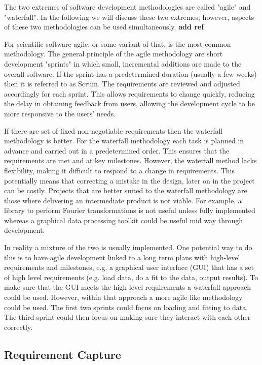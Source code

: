 \documentclass[jnr]{iosart2x}
\newcommand{\todo}[1]{\textbf{#1}}
\begin{document}
The two extremes of software development methodologies are called "agile" and "waterfall".
In the following we will discuss these two extremes; however, aspects of these two methodologies can be used simultaneously. \todo{add ref}

For scientific software agile, or some variant of that, is the most common methodology.
The general principle of the agile methodology are short development "sprints" in which small, incremental additions are made to the overall software.
If the sprint has a predetermined duration (usually a few weeks) then it is referred to as Scrum.
The requirements are reviewed and adjusted accordingly for each sprint.
This allows requirements to change quickly, reducing the delay in obtaining feedback from users, allowing the development cycle to be more responsive to the users' needs.

If there are set of fixed non-negotiable requirements then the waterfall methodology is better.
For the waterfall methodology each task is planned in advance and carried out in a predetermined order.
This ensures that the requirements are met and at key milestones.
However, the waterfall method lacks flexibility, making it difficult to respond to a change in requirements.
This potentially means that correcting a mistake in the design, later on in the project can be costly.
Projects that are better suited to the waterfall methodology are those where delivering an intermediate product is not viable.
For example, a library to perform Fourier transformations is not useful unless fully implemented whereas a graphical data processing toolkit could be useful mid way through development.

In reality a mixture of the two is usually implemented.
One potential way to do this is to have agile development linked to a long term plans with high-level requirements and milestones, e.g. a graphical user interface (GUI) that has a set of high level requirements (e.g. load data, do a fit to the data, output results).
To make sure that the GUI meets the high level requirements a waterfall approach could be used.
However, within that approach a more agile like methodology could be used.
The first two sprints could focus on loading and fitting to data.
The third sprint could then focus on making sure they interact with each other correctly.

\subsection{Requirement Capture}
\label{Requirements}
\end{document}
